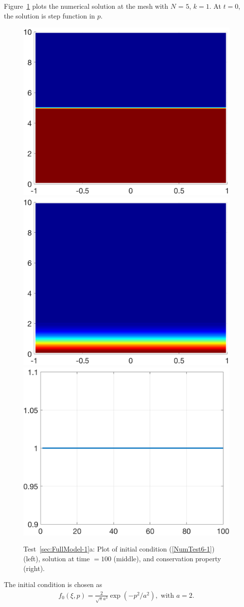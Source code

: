 \documentclass[preprint,11pt]{elsarticle}
\begin{document}
Figure~\ref{Fig:NumTest6-1-1} plots the numerical solution at the mesh with $N$ = $5$, $k=1$. At $t=0$, the solution is step function in ${p}$. 

\begin{figure}[H]
\centering
\includegraphics[width=.3\textwidth]{./NumFig/FullModel2D-1-Ini}
\includegraphics[width=.3\textwidth]{./NumFig/FullModel2D-1-100}
\includegraphics[width=.3\textwidth]{./NumFig/FullModel2D-1-Conv}
\caption{Test~\ref{sec:FullModel-1}a: Plot of initial condition (\ref{NumTest6-1}) (left), solution at time $= 100$ (middle), and conservation property (right).}\label{Fig:NumTest6-1-1}
\end{figure}

The initial condition is chosen as
\begin{eqnarray}
f_0(\xi,{p}) = \frac{2}{\sqrt{\pi}a^3}\exp(-{p}^2/a^2), \text{ with } a = 2.\label{NumTest6-2}
\end{eqnarray}
\end{document}
